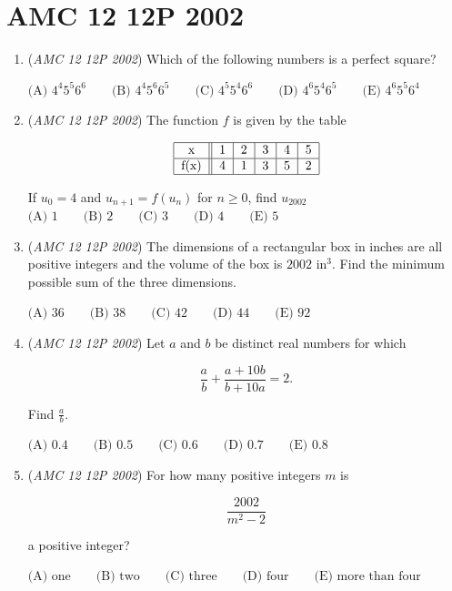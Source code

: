 \section{AMC 12 12P 2002}
        \begin{enumerate}
        	\item (\textit{AMC 12 12P 2002}) Which of the following numbers is a perfect square?


 $\text{(A) }4^4 5^5 6^6 \qquad \text{(B) }4^4 5^6 6^5 \qquad \text{(C) }4^5 5^4 6^6 \qquad \text{(D) }4^6 5^4 6^5 \qquad \text{(E) }4^6 5^5 6^4$


	\item (\textit{AMC 12 12P 2002}) The function $f$ is given by the table


 
 \[\begin{tabular}{|c||c|c|c|c|c|}  \hline   x & 1 & 2 & 3 & 4 & 5 \\   \hline  f(x) & 4 & 1 & 3 & 5 & 2 \\  \hline \end{tabular}\]


 If $u_0=4$ and $u_{n+1} = f(u_n)$ for $n \ge 0$, find $u_{2002}$
$\text{(A) }1 \qquad \text{(B) }2 \qquad \text{(C) }3 \qquad \text{(D) }4 \qquad \text{(E) }5$


	\item (\textit{AMC 12 12P 2002}) The dimensions of a rectangular box in inches are all positive integers and the volume of the box is $2002$ $\text{in}^3$. Find the minimum possible sum of the three dimensions.


 $\text{(A) }36 \qquad \text{(B) }38  \qquad \text{(C) }42 \qquad \text{(D) }44 \qquad \text{(E) }92$


	\item (\textit{AMC 12 12P 2002}) Let $a$ and $b$ be distinct real numbers for which

 \[\frac{a}{b} + \frac{a+10b}{b+10a} = 2.\]


 Find $\frac{a}{b}$.


 $\text{(A) }0.4 \qquad \text{(B) }0.5  \qquad \text{(C) }0.6 \qquad \text{(D) }0.7 \qquad \text{(E) }0.8$


	\item (\textit{AMC 12 12P 2002}) For how many positive integers $m$ is 

 \[\frac{2002}{m^2 -2}\]


 a positive integer?


 $\text{(A) one} \qquad \text{(B) two} \qquad \text{(C) three} \qquad \text{(D) four} \qquad \text{(E) more than four}$



\end{enumerate}
